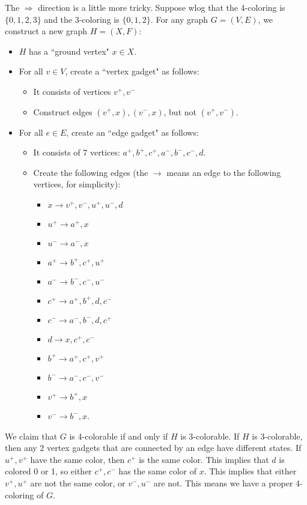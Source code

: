 \documentclass[10pt]{article}
\begin{document}
\begin{enumerate}
\par The $\Rightarrow$ direction is a little more tricky. Suppose wlog that the 4-coloring is $\{0, 1, 2, 3\}$ and the 3-coloring is $\{0, 1, 2\}$. For any graph $G = (V, E)$, we construct a new graph $H = (X, F)$:
\begin{itemize}
\item $H$ has a ``ground vertex" $x \in X$.
\item For all $v \in V$, create a ``vertex gadget" as follows:
\begin{itemize}
\item It consists of vertices $v^+, v^-$
\item Construct edges $(v^+, x), (v^-, x)$, but not $(v^+, v^-)$.
\end{itemize}
\item For all $e \in E$, create an ``edge gadget" as follows:
\begin{itemize}
\item It consists of 7 vertices: $a^+, b^+, c^+, a^-, b^-, c^-, d$. 
\item Create the following edges (the $\rightarrow$ means an edge to the following vertices, for simplicity):
\begin{itemize}
\item $x \rightarrow v^+, v^-, u^+, u^-, d$
\item $u^+ \rightarrow a^+, x$
\item $u^- \rightarrow a^-, x$
\item $a^+ \rightarrow b^+, c^+, u^+$
\item $a^- \rightarrow b^-, c^-, u^-$
\item $c^+ \rightarrow a^+, b^+, d, c^-$
\item $c^- \rightarrow a^-, b^-, d, c^+$
\item $d \rightarrow x, c^+, c^-$
\item $b^+ \rightarrow a^+, c^+, v^+$
\item $b^- \rightarrow a^-, c^-, v^-$
\item $v^+ \rightarrow b^+, x$
\item $v^- \rightarrow b^-, x$.
\end{itemize}
\end{itemize}
\end{itemize}
We claim that $G$ is 4-colorable if and only if $H$ is 3-colorable. If $H$ is 3-colorable, then any 2 vertex gadgets that are connected by an edge have different states. If $u^+, v^+$ have the same color, then $c^+$ is the same color. This implies that $d$ is colored 0 or 1, so either $c^+, c^-$ has the same color of $x$. This implies that either $v^+, u^+$ are not the same color, or $v^-, u^-$ are not. This means we have a proper 4-coloring of $G$.


\end{enumerate}
\end{document}
